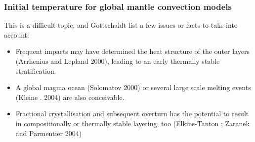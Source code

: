 



\subsubsection{Initial temperature for global mantle convection models}

This is a difficult topic, and Gottschaldt \etal \cite{gows09} list a few issues or 
facts to take into account:
\begin{itemize}
\item Frequent  impacts  may  have  determined  the  heat structure of the outer layers (Arrhenius and Lepland 2000), leading to an early thermally stable stratification. 
\item A global magma ocean (Solomatov 2000)  or  several  large  scale  melting events  (Kleine \etal. 2004)  
are also conceivable. 
\item Fractional crystallisation and subsequent overturn has the potential to result in 
compositionally or thermally stable layering, too (Elkins-Tanton ; Zaranek and Parmentier 2004)
\end{itemize}



